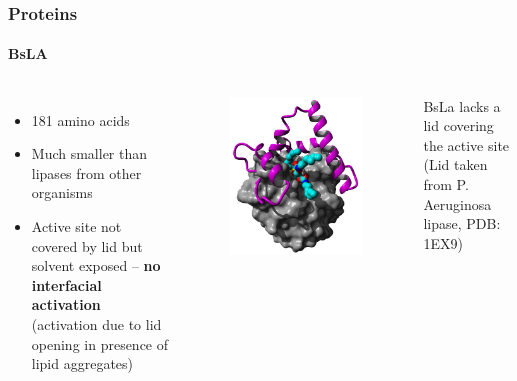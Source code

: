 \documentclass[english]{beamer}
\begin{document}
\begin{frame}
    \frametitle{Proteins}
    \framesubtitle{BsLA}

    \begin{columns}[t]
        \begin{itemize}
            \item 181 amino acids
            \item Much smaller than lipases from other organisms
            \item Active site not covered by lid but solvent exposed -- \textbf{no interfacial activation} (activation due to lid opening in presence of lipid aggregates)
        \end{itemize} 

        \begin{figure}
            \includegraphics[width=\linewidth]{figures/Lipase_Lid.png}
        \end{figure}     
        \tiny BsLa lacks a lid covering the active site (Lid taken from P. Aeruginosa lipase, PDB: 1EX9)

    \end{columns} 

\end{frame} 
\end{document}
